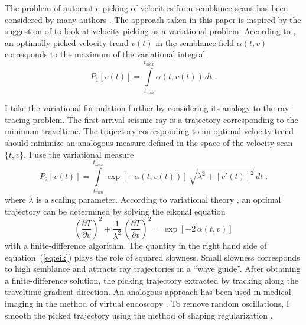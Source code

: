 
\appendix
{}

The problem of automatic picking of velocities from semblance scans
has been considered by many authors
\cite[]{SEG-1999-11621165,SEG-2003-20882091,SEG-2004-16271629}. The
approach taken in this paper is inspired by the suggestion of
\cite{harlan} to look at velocity picking as a variational
problem. According to \cite{harlan}, an optimally picked velocity trend
$v(t)$ in the semblance field $\alpha(t,v)$ corresponds to the maximum
of the variational integral
\begin{equation}
P_1[v(t)] = \int\limits_{t_{min}}^{t_{max}} \alpha\left(t,v(t)\right)\,d t\;.
\end{equation}

I take the variational formulation further by considering its
analogy to the ray tracing problem. The first-arrival seismic
ray is a trajectory corresponding to the minimum traveltime. The
trajectory corresponding to an optimal velocity trend should minimize
an analogous measure defined in the space of the velocity
scan~$\{t,v\}$. I use the variational measure
\begin{equation}
P_2[v(t)] = \int\limits_{t_{min}}^{t_{max}}
\exp[-\alpha\left(t,v(t)\right)]\,\sqrt{\lambda^2+\left[v'(t)\right]^2}\,d t\;.
\end{equation}
where $\lambda$ is a scaling parameter. According to  variational theory
\cite[]{lanc}, an optimal trajectory can be determined by solving the eikonal equation
\begin{equation}
\label{eq:eik}
\left(\frac{\partial T}{\partial v}\right)^2 + 
\frac{1}{\lambda^2}\,\left(\frac{\partial T}{\partial t}\right)^2 = 
\exp[-2\,\alpha\left(t,v\right)]
\end{equation}
with a finite-difference algorithm. The quantity in the right hand
side of equation~(\ref{eq:eik}) plays the role of squared slowness.
Small slowness corresponds to high semblance and attracts ray
trajectories in a ``wave guide''. After obtaining a finite-difference
solution, the picking trajectory   extracted by
tracking  along the traveltime gradient direction. An
analogous approach has been used in medical imaging in the method of
virtual endoscopy \cite[]{thomas}.  To remove random oscillations, I
smooth the picked trajectory using the method of shaping
regularization
\cite[]{shape}.



